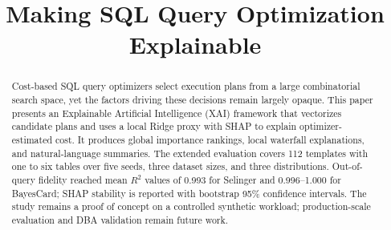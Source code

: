 \documentclass[conference]{IEEEtran}
\begin{document}
\title{Making SQL Query Optimization Explainable}

\author{
}



\maketitle

\begin{abstract}
Cost-based SQL query optimizers select execution plans from a large combinatorial search space, yet the factors driving these decisions remain largely opaque. This paper presents an Explainable Artificial Intelligence (XAI) framework that vectorizes candidate plans and uses a local Ridge proxy with SHAP to explain optimizer-estimated cost. It produces global importance rankings, local waterfall explanations, and natural-language summaries. The extended evaluation covers 112 templates with one to six tables over five seeds, three dataset sizes, and three distributions. Out-of-query fidelity reached mean $R^2$ values of 0.993 for Selinger and 0.996--1.000 for BayesCard; SHAP stability is reported with bootstrap 95\% confidence intervals. The study remains a proof of concept on a controlled synthetic workload; production-scale evaluation and DBA validation remain future work.
\end{abstract}
\end{document}
